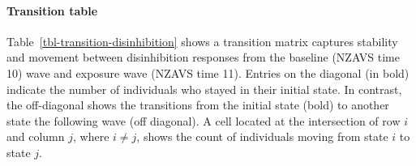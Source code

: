 \documentclass[
  singlecolumn]{article}
\let\oldparagraph\paragraph
\renewcommand{\paragraph}[1]{\oldparagraph{#1}\mbox{}}
\begin{document}
\paragraph{Transition table}\label{transition-table-1}

Table~\ref{tbl-transition-disinhibition} shows a transition matrix
captures stability and movement between disinhibition responses from the
baseline (NZAVS time 10) wave and exposure wave (NZAVS time 11). Entries
on the diagonal (in bold) indicate the number of individuals who stayed
in their initial state. In contrast, the off-diagonal shows the
transitions from the initial state (bold) to another state the following
wave (off diagonal). A cell located at the intersection of row \(i\) and
column \(j\), where \(i \neq j\), shows the count of individuals moving
from state \(i\) to state \(j\).
\end{document}
